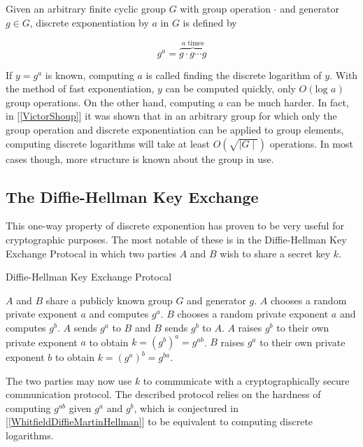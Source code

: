 
Given an arbitrary finite cyclic group $G$ with group operation $\cdot$ and generator $g \in G$, discrete exponentiation by $a$ in $G$ is defined by 

$$
g^a = \overbrace{g \cdot g \cdots g}^{a \text{ times}}
$$

If $y = g^a$ is known, computing $a$ is called finding the discrete logarithm of $y$. With the method of fast exponentiation, $y$ can be computed quickly, only $O(\text{log } a)$ group operations. On the other hand, computing $a$ can be much harder. In fact, in [\ref{VictorShoup}] it was shown that in an arbitrary group for which only the group operation and discrete exponentiation can be applied to group elements, computing discrete logarithms will take at least $O(\sqrt{\mid G \mid})$ operations. In most cases though, more structure is known about the group in use.  

\subsection{The Diffie-Hellman Key Exchange}

This one-way property of discrete exponention has proven to be very useful for cryptographic purposes. The most notable of these is in the Diffie-Hellman Key Exchange Protocal in which two parties $A$ and $B$ wish to share a secret key $k$.

\begin{algorithm} 
	\caption{Diffie-Hellman Key Exchange Protocal}
	\begin{algorithmic}[1]
		\State $A$ and $B$ share a publicly known group $G$ and generator $g$.
		\State $A$ chooses a random private exponent $a$ and computes $g^a$.
		\State $B$ chooses a random private exponent $a$ and computes $g^b$.
		\State $A$ sends $g^a$ to $B$ and $B$ sends $g^b$ to $A$. 
		\State $A$ raises $g^b$ to their own private exponent $a$ to obtain $k = (g^b)^a = g^{ab}$.
		\State $B$ raises $g^a$ to their own private exponent $b$ to obtain $k = (g^a)^b = g^{ba}$.
	\end{algorithmic} 
\end{algorithm}  


The two parties may now use $k$ to communicate with a cryptographically secure communication protocol. The described protocol relies on the hardness of computing $g^{ab}$ given $g^a$ and $g^b$, which is conjectured in [\ref{WhitfieldDiffieMartinHellman}] to be equivalent to computing discrete logarithms.


